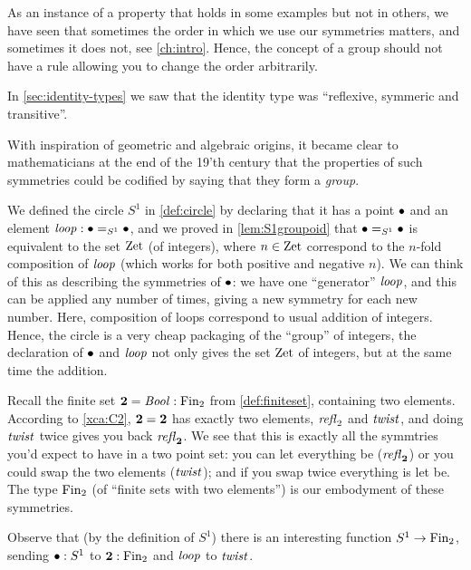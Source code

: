 \begin{definition}
As an instance of a property that holds in some examples but not in others, we have seen that sometimes the order in which we use our symmetries matters, and sometimes it does not, see \cref{ch:intro}.  Hence, the concept of a group should not have a rule allowing you to change the order arbitrarily.

In \cref{sec:identity-types} we saw that the identity type was ``reflexive, symmeric and transitive''.

With inspiration of geometric and algebraic origins, it became clear to mathematicians at the end of the 19'th century that the properties of such symmetries could be codified by saying that they form a \emph{group}.

\begin{example}\label{ex:base=base}
  We defined the circle $S^1$ in \cref{def:circle} by declaring that it has a point $\bullet$ and an element $\mathit{loop}:\bullet=_{S^1}\bullet$, and we proved in \cref{lem:S1groupoid} that $\bullet=_{S^1}\bullet$ is equivalent to the set $\mathrm{Zet}$ (of integers), where $n\in\mathrm{Zet}$ correspond to the $n$-fold composition of $\mathit{loop}$ (which works for both positive and negative $n$).  We can think of this as describing the symmetries of $\bullet$: we have one ``generator'' $\mathit{loop}$, and this can be applied any number of times, giving a new symmetry for each new number.  Here, composition of loops correspond to usual addition of integers.  Hence, the circle is a very cheap packaging of the ``{group}'' of integers, the declaration of $\bullet$ and $\mathit{loop}$ not only gives the set $\mathrm{Zet}$ of integers, but at the same time the addition.
\end{example}
\begin{example}
  Recall the finite set $\mathbf{2} =\mathop{\mathit{Bool}}:\mathrm{Fin}_2$ from \cref{def:finiteset}, containing two elements.   According to \cref{xca:C2}, $\mathbf{2} =\mathbf{2} $ has exactly two elements, $\mathop{{\it refl}_{\mathrm 2}}$ and $\mathit{twist}$, and doing $\mathit{twist}$ twice gives you back $\mathop{{\it refl}_{\mathbf{2} }}$.  We see that this is exactly all the symmtries you'd expect to have in a two point set: you can let everything be ($\mathop{{\it refl}_{\mathbf{2} }}$) or you could swap the two elements ($\mathit{twist}$); and if you swap twice everything is let be.  The type $\mathrm{Fin}_2$ (of ``finite sets with two elements'') is our embodyment of these symmetries.  

Observe that (by the definition of $S^1$) there is an interesting function $S^1\to\mathrm{Fin}_2$, sending $\bullet:S^1$ to $\mathbf{2} :\mathrm{Fin}_2$ and $\mathit{loop}$ to $\mathit{twist}$.
\end{example}



\end{definition}
